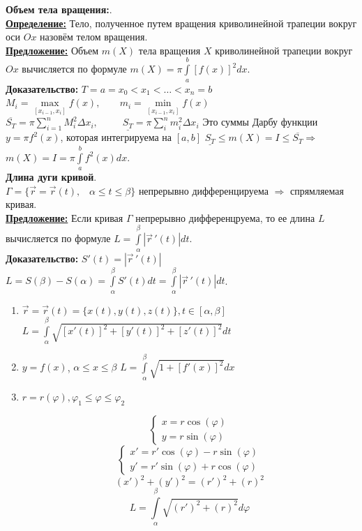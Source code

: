 \documentclass[a4paper,12pt]{article} %
\renewcommand {\leq}{\leqslant}
\begin{document}
\noindent \textbf{Объем тела вращения:}.\\
\underline{\textbf{Определение:}}
Тело, полученное путем вращения криволинейной трапеции вокруг оси $Ox$ назовём телом вращения.\\
\underline{\textbf{Предложение:}}
Объем $m(X)$ тела вращения $X$ криволинейной трапеции вокруг $Ox$ вычисляется по формуле $m(X) = \pi \int\limits_a^b[f(x)]^2dx$.\\
\textbf{Доказательство:} $T={a=x_0<x_1<\dots<x_n = b}$
$M_i = \max \limits_{[x_{i-1}, x_i]} f(x), \;\;\;\;\;\;\; m_i=\min \limits_{[x_{i-1}, x_i]} f(x)$
$\overline{S_T} = \pi \sum\limits_{i=1}^n M_i^2 \Delta x_i, \;\;\;\;\;\;\;\;\; \underline{S_T} = \pi \sum\limits_i^n m_i^2 \Delta x_i$
Это суммы Дарбу функции $y = \pi f^2(x)$, которая интегрируема на $[a, b]$
$\underline{S_T} \leq m(X) = I \leq \overline{S_T} \Rightarrow$ $m(X) = I = \pi \int\limits_a^b f^2(x)dx$.\\
\noindent \textbf{Длина дуги кривой}.\\
$\Gamma = \{\Vec{r} = \Vec{r}(t),\;\;\; \alpha \leq t \leq \beta\}$ непрерывно дифференцируема $\Rightarrow$ спрямляемая кривая.\\
\underline{\textbf{Предложение:}}
Если кривая $\Gamma$ непрерывно дифференцруема, то ее длина $L$ вычисляется по формуле $L=\int\limits_{\alpha}^{\beta} |\Vec{r}\,'(t)|dt$.\\
\textbf{Доказательство:} $S'(t)=|\Vec{r}\,'(t)|$
$L = S(\beta) - S(\alpha) = \int \limits_{\alpha}^{\beta} S'(t)dt = \int \limits_{\alpha}^{\beta} |\Vec{r}\,'(t)| dt$.
\begin{enumerate}
	\item $\Vec{r} = \Vec{r}(t) = \{ x(t), y(t), z(t) \}, t \in [\alpha, \beta]$
	$L = \int \limits_\alpha^\beta \sqrt{[x'(t)]^2+[y'(t)]^2+[z'(t)]^2}dt$
	
	\item $y=f(x)$, $\alpha \leq x \leq \beta$
	$L=\int\limits_\alpha^\beta \sqrt{1+[f'(x)]^2}dx$
	
	\item $r=r(\varphi), \varphi_1 \leq \varphi \leq \varphi_2$
	
	\begin{equation*}
		\begin{cases}
			x=r \cos(\varphi)
			\\
			y = r \sin(\varphi)
			
		\end{cases}
	\end{equation*}
	\begin{equation*}
		\begin{cases}
			x'=r' \cos(\varphi) - r\sin(\varphi)
			\\
			y' = r' \sin(\varphi) + r\cos(\varphi)
			
		\end{cases}
	\end{equation*}
	\begin{equation}
		(x')^2+(y')^2=(r')^2+(r)^2  
	\end{equation}
	\begin{equation}
		L =\int\limits_\alpha^\beta \sqrt{(r')^2+(r)^2}d\varphi 
	\end{equation}
\end{enumerate}
\end{document}
